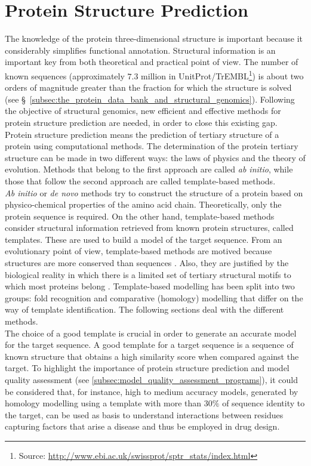 \section{Protein Structure Prediction}
\label{sec:protein_structure_prediction}
The knowledge of the protein three-\-di\-men\-sio\-nal structure is important because it considerably simplifies functional annotation. Structural information is an important key from both theoretical and practical point of view. The number of known sequences (approximately $7.3$ million in UnitProt/TrEMBL\footnote{Source: \href{http://www.ebi.ac.uk/swissprot/sptr\_stats/index.html}{http://www.ebi.ac.uk/swissprot/sptr\_stats/index.html}}) is about two orders of magnitude greater than the fraction for which the structure is solved (see \S~\ref{subsec:the_protein_data_bank_and_structural_genomics}). 
Following the objective of structural genomics, new efficient and effective methods for protein structure prediction are needed, in order to close this existing gap.\\
Protein structure prediction means the prediction of tertiary structure of a protein using computational methods. The determination of the protein tertiary structure can be made in two different ways: the laws of physics and the theory of evolution. Methods that belong to the first approach are called \emph{ab initio}, while those that follow the second approach are called template-based methods.\\
\emph{Ab initio} or \emph{de novo} methods try to construct the structure of a protein based on physico-chemical properties of the amino acid chain. Theoretically, only the protein sequence is required. On the other hand, template-based methods consider structural information retrieved from known protein structures, called templates. These are used to build a model of the target sequence. From an evolutionary point of view, template-based methods are motived because structures are more conserved than sequences \cite{Chothia1986aa}. Also, they are justified by the biological reality in which there is a limited set of tertiary structural motifs to which most proteins belong \cite{Chothia1992aa}. Template-based modelling has been split into two groups: fold recognition and comparative (homology) modelling that differ on the way of template identification. The following sections deal with the different methods.\\
The choice of a good template is crucial in order to generate an accurate model for the target sequence. A good template  for a target sequence is a sequence of known structure that obtains a high similarity score when compared against the target. To highlight the importance of protein structure prediction and model quality assessment (see \ref{subsec:model_quality_assessment_programs}), it could be considered that, for instance, high to medium accuracy models, generated by homology modelling using a template with more than $30\%$ of sequence identity to the target, can be used as basis to understand interactions between residues capturing factors that arise a disease and thus be employed in drug design.


